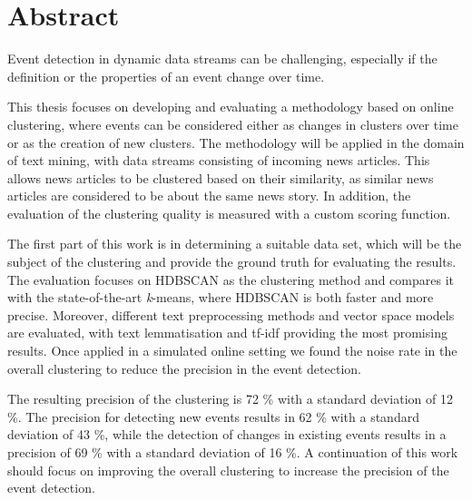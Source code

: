 
\section*{Abstract}



Event detection in dynamic data streams can be challenging, 
especially if the definition or the properties of an event change over time.

This thesis focuses on developing and evaluating a methodology based on online clustering, where events can be considered either as changes in clusters over time or as the creation of new clusters. 
The methodology will be applied in the domain of text mining, 
with data streams consisting of incoming news articles. 
This allows news articles to be clustered based on their similarity, 
as similar news articles are considered to be about the same news story. 
In addition, the evaluation of the clustering quality is measured with a custom scoring function.

The first part of this work is in determining a suitable data set, 
which will be the subject of the clustering and provide the ground truth for evaluating the results. 
The evaluation focuses on HDBSCAN as the clustering method and compares it with the state-of-the-art \textit{k}-means, 
where HDBSCAN is both faster and more precise. 
Moreover, different text preprocessing methods and vector space models are evaluated, with text lemmatisation and tf-idf providing the most promising results. 
Once applied in a simulated online setting we found the noise rate in the overall clustering to reduce the precision in the event detection.

The resulting precision of the clustering is 72 \% with a standard deviation of 12 \%. 
The precision for detecting new events results in 62 \% with a standard deviation of 43 \%, 
while the detection of changes in existing events results in a precision of 69 \% with a standard deviation of 16 \%. 
A continuation of this work should focus on improving the overall clustering to increase the precision of the event detection.